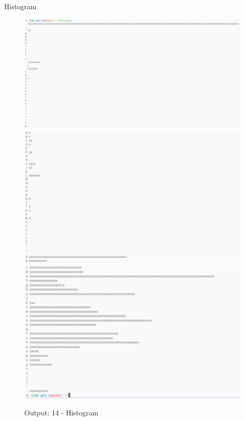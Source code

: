 Histogram
\begin{figure}[!htb]
  \centering
  \includegraphics[width=6in]{Images/histogram1.png}
  \includegraphics[width=6in]{Images/histogram2.png}
  \includegraphics[width=6in]{Images/histogram3.png}
  \label{output:14-Histogram}
  \caption{Output: 14 - Histogram}
\end{figure}